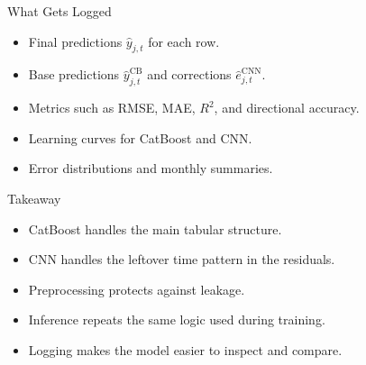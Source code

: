 \documentclass[aspectratio=169]{beamer}
\begin{document}
\begin{frame}{What Gets Logged}
  \begin{itemize}
    \item Final predictions $\hat y_{j,t}$ for each row.
    \item Base predictions $\hat y^{\mathrm{CB}}_{j,t}$ and corrections $\hat e^{\mathrm{CNN}}_{j,t}$.
    \item Metrics such as RMSE, MAE, $R^2$, and directional accuracy.
    \item Learning curves for CatBoost and CNN.
    \item Error distributions and monthly summaries.
  \end{itemize}
\end{frame}

\begin{frame}{Takeaway}
  \begin{itemize}
    \item CatBoost handles the main tabular structure.
    \item CNN handles the leftover time pattern in the residuals.
    \item Preprocessing protects against leakage.
    \item Inference repeats the same logic used during training.
    \item Logging makes the model easier to inspect and compare.
  \end{itemize}
\end{frame}
\end{document}
